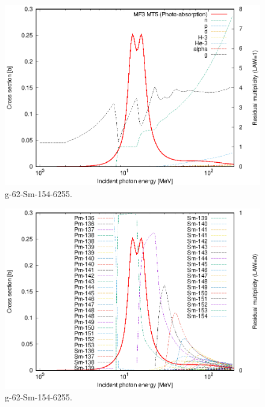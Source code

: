 \begin{figure}
 \includegraphics[width=\linewidth]{eps/g_62-Sm-154_6255.eps}
  \caption{g-62-Sm-154-6255.}
\end{figure}
\begin{figure}
 \includegraphics[width=\linewidth]{eps-law0/g_62-Sm-154_6255.eps}
 \caption{g-62-Sm-154-6255.}
\end{figure}
\newpage \clearpage

